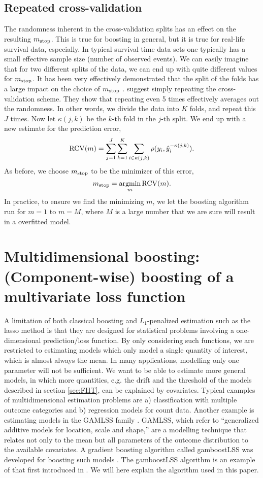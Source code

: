 \subsection{Repeated cross-validation}
The randomness inherent in the cross-validation splits has an effect on the resulting $m_{\text{stop}}$. This is true for boosting in general, but it is true for real-life survival data, especially. In typical survival time data sets one typically has a small effective sample size (number of observed events). We can easily imagine that for two different splits of the data, we can end up with quite different values for $m_{\text{stop}}$.
It has been very effectively demonstrated that the split of the folds has a large impact on the choice of $m_{\text{stop}}$ \citep{seibold}. \citet{seibold} suggest simply repeating the cross-validation scheme. They show that repeating even 5 times effectively averages out the randomness.  In other words, we divide the data into $K$ folds, and repeat this $J$ times. Now let $\kappa(j, k)$ be the $k$-th fold in the $j$-th split. We end up with a new estimate for the prediction error,
\begin{equation}
    \operatorname{RCV}(m)=\sum_{j=1}^J\sum_{k=1}^K\sum_{i\in\kappa(j,k)}\rho(y_i,\hat{y}_i^{-\kappa(j,k)}).
\end{equation}
As before, we choose $m_{\text{stop}}$ to be the minimizer of this error,
\begin{equation}
    m_{\text{stop}}=\operatorname*{argmin}_{m}\operatorname{RCV}(m).
\end{equation}
In practice, to ensure we find the minimizing $m$, we let the boosting algorithm run for $m=1$ to $m=M$, where $M$ is a large number that we are sure will result in a overfitted model.

\section{Multidimensional boosting: (Component-wise) boosting of a multivariate loss function}
A limitation of both classical boosting \citep{friedman2001} and $L_1$-penalized estimation such as the lasso method \citep{lasso} is that they are designed for statistical problems involving a one-dimensional prediction/loss function. By only considering such functions, we are restricted to estimating models which only model a single quantity of interest, which is almost always the mean.
In many applications, modelling only one parameter will not be sufficient. We want to be able to estimate more general models, in which more quantities, e.g. the drift and the threshold of the models described in section \ref{sec:FHT}, can be explained by covariates. Typical examples of multidimensional estimation problems are a) classification with multiple outcome categories and b) regression models for count data. Another example is estimating models in the GAMLSS family \citep{gamlss}. GAMLSS, which refer to ``generalized additive models for location, scale and shape,'' are a modelling technique that relates not only to the mean but all parameters of the outcome distribution to the available covariates. A gradient boosting algorithm called gamboostLSS was developed for boosting such models \citep{gamboostlss-paper}. The gamboostLSS algorithm is an example of that first introduced in \citet{schmid}. We will here explain the algorithm used in this paper.

